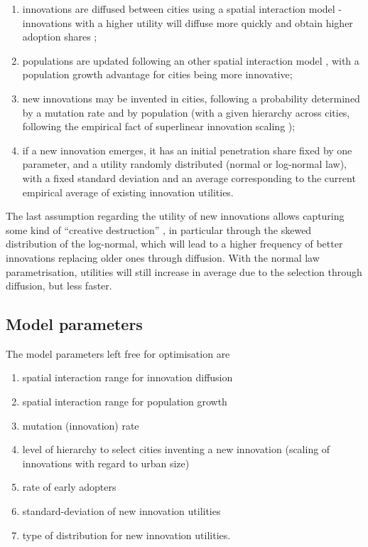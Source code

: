 \documentclass[final,5p,times,twocolumn,authoryear]{elsarticle}
\begin{document}
\begin{enumerate}
	\item innovations are diffused between cities using a spatial interaction model - innovations with a higher utility will diffuse more quickly and obtain higher adoption shares \citep{hagerstrand1968innovation};
	\item populations are updated following an other spatial interaction model \citep{raimbault2020indirect}, with a population growth advantage for cities being more innovative;
	\item new innovations may be invented in cities, following a probability determined by a mutation rate and by population (with a given hierarchy across cities, following the empirical fact of superlinear innovation scaling \citep{arbesman2009superlinear});
	\item if a new innovation emerges, it has an initial penetration share fixed by one parameter, and a utility randomly distributed (normal or log-normal law), with a fixed standard deviation and an average corresponding to the current empirical average of existing innovation utilities.
\end{enumerate}

The last assumption regarding the utility of new innovations allows capturing some kind of ``creative destruction'' \citep{diamond2006schumpeter}, in particular through the skewed distribution of the log-normal, which will lead to a higher frequency of better innovations replacing older ones through diffusion. With the normal law parametrisation, utilities will still increase in average due to the selection through diffusion, but less faster.


\subsection{Model parameters}

The model parameters left free for optimisation are

\begin{enumerate}
    \item spatial interaction range for innovation diffusion
    \item spatial interaction range for population growth
    \item mutation (innovation) rate
    \item level of hierarchy to select cities inventing a new innovation (scaling of innovations with regard to urban size)
    \item rate of early adopters
    \item standard-deviation of new innovation utilities
    \item type of distribution for new innovation utilities.
\end{enumerate}
\end{document}
